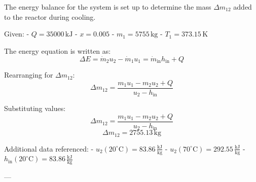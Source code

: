 The energy balance for the system is set up to determine the mass \( \Delta m_{12} \) added to the reactor during cooling.  

Given:  
- \( Q = 35000 \, \text{kJ} \)  
- \( x = 0.005 \)  
- \( m_1 = 5755 \, \text{kg} \)  
- \( T_1 = 373.15 \, \text{K} \)  

The energy equation is written as:  
\[
\Delta E = \dot{m}_2 u_2 - \dot{m}_1 u_1 = \dot{m}_{\text{in}} h_{\text{in}} + Q
\]  

Rearranging for \( \Delta m_{12} \):  
\[
\Delta m_{12} = \frac{m_1 u_1 - m_2 u_2 + Q}{u_2 - h_{\text{in}}}
\]  

Substituting values:  
\[
\Delta m_{12} = \frac{m_1 u_1 - m_2 u_2 + Q}{u_2 - h_{\text{in}}}
\]  
\[
\Delta m_{12} = 2755.13 \, \text{kg}
\]  

Additional data referenced:  
- \( u_2(20^\circ\text{C}) = 83.86 \, \frac{\text{kJ}}{\text{kg}} \)  
- \( u_2(70^\circ\text{C}) = 292.55 \, \frac{\text{kJ}}{\text{kg}} \)  
- \( h_{\text{in}}(20^\circ\text{C}) = 83.86 \, \frac{\text{kJ}}{\text{kg}} \)  

---